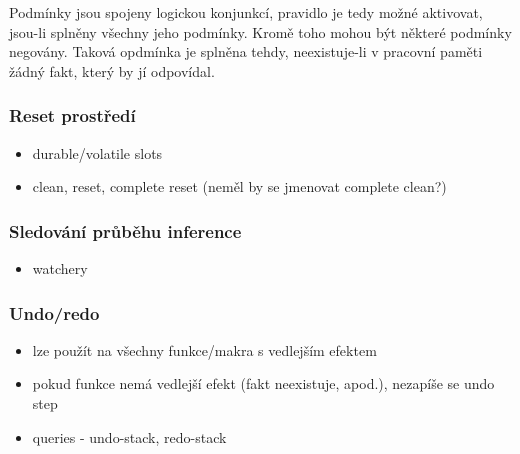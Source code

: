 Podmínky jsou spojeny logickou konjunkcí, pravidlo je tedy možné aktivovat,
jsou-li splněny všechny jeho podmínky. Kromě toho mohou být některé podmínky
negovány. Taková opdmínka je splněna tehdy, neexistuje-li v pracovní paměti
žádný fakt, který by jí odpovídal.

\subsubsection{Reset prostředí}
\begin{framed}
  \begin{itemize}
    \item durable/volatile slots
    \item clean, reset, complete reset (neměl by se jmenovat complete clean?)
  \end{itemize}
\end{framed}

\subsubsection{Sledování průběhu inference}
\label{inference tracing}
\begin{framed}
  \begin{itemize}
    \item watchery
  \end{itemize}
\end{framed}

\subsubsection{Undo/redo}
\begin{framed}
  \begin{itemize}
    \item lze použít na všechny funkce/makra s vedlejším efektem
    \item pokud funkce nemá vedlejší efekt (fakt neexistuje, apod.), nezapíše se
      undo step
    \item queries - undo-stack, redo-stack
  \end{itemize}
\end{framed}

